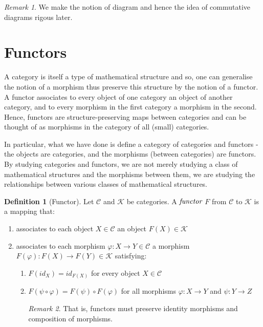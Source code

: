 \documentclass[10pt, oneside, reqno]{amsart}
\theoremstyle{plain}%
\theoremstyle{definition}
\newtheorem{defn}[thm]{Definition}
\theoremstyle{remark}
\newtheorem*{rem}{Remark}
\begin{document}
\begin{rem}
 We make the notion of diagram and hence the idea of commutative diagrams rigous later.
\end{rem}


\section{Functors} %
\label{sec:functors}
A category is itself a type of mathematical structure and so, one can generalise the notion of a morphism thus preserve this structure by the notion of a
functor.
A functor associates to every object of one category an object of another category, and to every morphism in the first category a morphism in the second.
Hence, functors are structure-preserving maps between categories and can be thought of as morphisms in the category of all (small) categories.

In particular, what we have done is define a category of categories and functors - the objects are categories, and the morphisms (between categories) 
are functors.
By studying categories and functors, we are not merely studying a class of mathematical structures and the morphisms between them,
we are studying the relationships between various classes of mathematical structures.

\begin{defn}[Functor]
	Let $\mathcal{C}$ and $\mathcal{K}$ be categories. A $\emph{functor}$ $F$ from $\mathcal{C}$ to $\mathcal{K}$ is a mapping that:
	\begin{enumerate}
		\item associates to each object $X \in \mathcal{C}$ an object $F(X) \in  \mathcal{K}$
		
		\item associates to each morphism $\varphi: X \to Y \in \mathcal{C}$ a morphism $F(\varphi) : F(X) \to F(Y) \in \mathcal{K}$
		satisfying:
		\begin{enumerate}
			\item $F(id_{X}) = id_{F(X)}$ for every object $X \in \mathcal{C}$
			
			\item $F(\psi \circ \varphi) = F(\psi) \circ F(\varphi)$ for all morphisms $\varphi: X \to Y$ and $\psi: Y \to Z$
			\begin{rem}
				That is, functors must preserve identity morphisms and composition of morphisms.
			\end{rem}
		\end{enumerate}
	\end{enumerate}
\end{defn}
\end{document}
